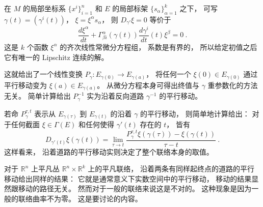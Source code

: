 在 $M$ 的局部坐标系 $\{x^i\}_{i=1}^n$ 和 $E$ 的局部标架 $\{s_{\alpha}\}_{\alpha=1}^k$ 之下， 可写 $\gamma(t)=(\gamma^i(t))$， $\xi=\xi^\alpha s_\alpha$， 则 $D_{\gamma'}\xi=0$ 等价于
$$
\frac{d\xi^\alpha}{dt}+\Gamma_{\beta i}^\alpha(\gamma(t))\frac{d\gamma^i}{dt}(t)\xi^\beta=0~.
$$
这是 $k$ 个函数 $\xi^\alpha$ 的齐次线性常微分方程组， 系数是有界的， 所以给定初值之后它有唯一的 Lipschitz 连续的解。 

这就给出了一个线性变换 $P_{\gamma}:E_{\gamma(0)}\to E_{\gamma(a)}$， 将任何一个 $\xi(0)\in E_{\gamma(0)}$ 通过平行移动变为 $\xi(a)\in E_{\gamma(a)}$。 从微分方程本身可得出终值与 $\gamma$ 重参数化的方法无关。 简单计算给出 $P_\gamma^{-1}$ 实为沿着反向道路 $\gamma^{-1}$ 的平行移动。 

若命 $P_\gamma^{\tau,t}$ 表示从 $E_{\gamma(\tau)}$ 到 $E_{\gamma(t)}$ 的沿着 $\gamma$ 的平行移动， 则简单地计算给出： 对于任何截面 $\xi\in\Gamma(E)$ 和任何使得 $\gamma'(t)$ 存在的 $t$， 皆有
$$
D_{\gamma'(t)}\xi(\gamma(t))=\lim_{\tau\to t}\frac{P_\gamma^{\tau,t}\xi(\gamma(\tau))-\xi(\gamma(t))}{\tau-t}~.
$$
这样看来， 沿着道路的平行移动实则决定了整个联络本身的取值。

对于 $\mathbb{R}^n$ 上平凡丛 $\mathbb{R}^n\times\mathbb{R}^k$ 上的平凡联络， 沿着两条有同样起终点的道路的平行移动给出同样的结果： 它就是通常意义下实数空间中的平行移动， 移动的结果显然跟移动的路径无关。 然而对于一般的联络来说这是不对的。 这种现象是因为一般的联络曲率不为零。 这是要讨论的内容。
